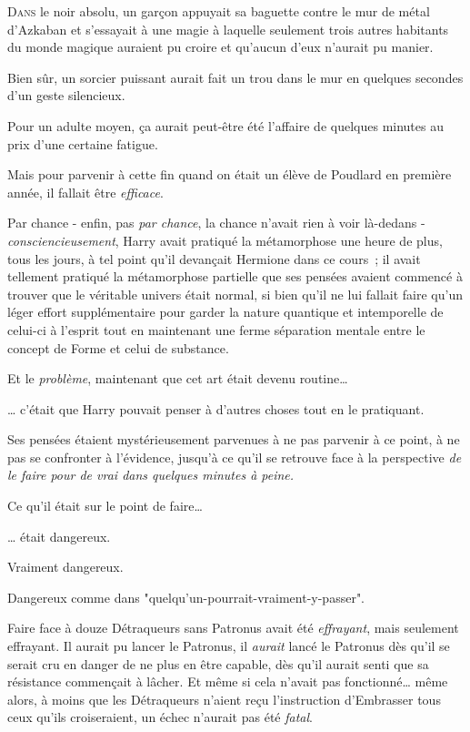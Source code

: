 

\lettrine{D}{ans}  le noir absolu, un garçon appuyait sa baguette contre le mur de métal d'Azkaban et s'essayait à une magie à laquelle seulement trois autres habitants du monde magique auraient pu croire et qu'aucun d'eux n'aurait pu manier.

Bien sûr, un sorcier puissant aurait fait un trou dans le mur en quelques secondes d'un geste silencieux.

Pour un adulte moyen, ça aurait peut-être été l'affaire de quelques minutes au prix d'une certaine fatigue.

Mais pour parvenir à cette fin quand on était un élève de Poudlard en première année, il fallait être \emph{efficace}.

Par chance - enfin, pas \emph{par chance}, la chance n'avait rien à voir là-dedans - \emdashhyp\emph{consciencieusement}, Harry avait pratiqué la métamorphose une heure de plus, tous les jours, à tel point qu'il devançait Hermione dans ce cours~; il avait tellement pratiqué la métamorphose partielle que ses pensées avaient commencé à trouver que le véritable univers était normal, si bien qu'il ne lui fallait faire qu'un léger effort supplémentaire pour garder la nature quantique et intemporelle de celui-ci à l'esprit tout en maintenant une ferme séparation mentale entre le concept de Forme et celui de substance.

Et le \emph{problème}, maintenant que cet art était devenu routine…

… c'était que Harry pouvait penser à d'autres choses tout en le pratiquant.

Ses pensées étaient mystérieusement parvenues à ne pas parvenir à ce point, à ne pas se confronter à l'évidence, jusqu'à ce qu'il se retrouve face à la perspective \emph{de le faire pour de vrai dans quelques minutes à peine.}

Ce qu'il était sur le point de faire…

… était dangereux.

Vraiment dangereux.

Dangereux comme dans "quelqu'un-pourrait-vraiment-y-passer".

Faire face à douze Détraqueurs sans Patronus avait été \emph{effrayant}, mais seulement effrayant. Il aurait pu lancer le Patronus, il \emph{aurait} lancé le Patronus dès qu'il se serait cru en danger de ne plus en être capable, dès qu'il aurait senti que sa résistance commençait à lâcher. Et même si cela n'avait pas fonctionné… même alors, à moins que les Détraqueurs n'aient reçu l'instruction d'Embrasser tous ceux qu'ils croiseraient, un échec n'aurait pas été \emph{fatal}.

